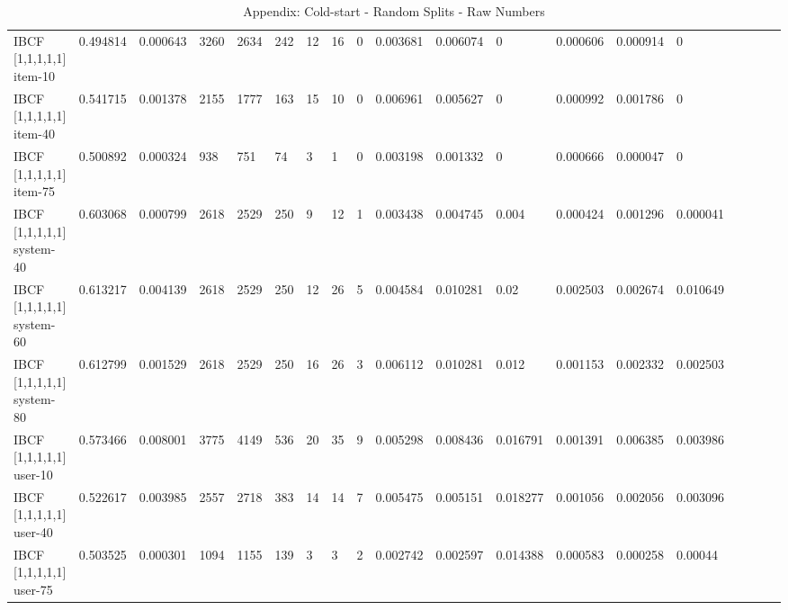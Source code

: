 \begin{table}
{\begin{tabular}{*{19}l}
IBCF [1,1,1,1,1] item-10		&	0.494814 &	0.000643 &	3260 &	2634 &	242 &	12 &	16 &	0 &	0.003681 &	0.006074 &	0 &	0.000606 &	0.000914 &	0 &	 \\
IBCF [1,1,1,1,1] item-40		&	0.541715 &	0.001378 &	2155 &	1777 &	163 &	15 &	10 &	0 &	0.006961 &	0.005627 &	0 &	0.000992 &	0.001786 &	0 &	 \\
IBCF [1,1,1,1,1] item-75		&	0.500892 &	0.000324 &	938 &	751 &	74 &	3  &	1 &	0 &	0.003198 &	0.001332 &	0 &	0.000666 &	0.000047 &	0 &	 \\
IBCF [1,1,1,1,1] system-40	&	0.603068 &	0.000799 &	2618 &	2529 &	250 &	9  &	12 &	1 &	0.003438 &	0.004745 &	0.004 &	0.000424 &	0.001296 &	0.000041 &	 \\
IBCF [1,1,1,1,1] system-60	&	0.613217 &	0.004139 &	2618 &	2529 &	250 &	12 &	26 &	5 &	0.004584 &	0.010281 &	0.02 &	0.002503 &	0.002674 &	0.010649 &	 \\
IBCF [1,1,1,1,1] system-80	&	0.612799 &	0.001529 &	2618 &	2529 &	250 &	16 &	26 &	3 &	0.006112 &	0.010281 &	0.012 &	0.001153 &	0.002332 &	0.002503 &	 \\
IBCF [1,1,1,1,1] user-10		&	0.573466 &	0.008001 &	3775 &	4149 &	536 &	20 &	35 &	9 &	0.005298 &	0.008436 &	0.016791 &	0.001391 &	0.006385 &	0.003986 &	 \\
IBCF [1,1,1,1,1] user-40		&	0.522617 &	0.003985 &	2557 &	2718 &	383 &	14 &	14 &	7 &	0.005475 &	0.005151 &	0.018277 &	0.001056 &	0.002056 &	0.003096 &	 \\
IBCF [1,1,1,1,1] user-75		&	0.503525 &	0.000301 &	1094 &	1155 &	139 &	3 &	3 &	2 &	0.002742 &	0.002597 &	0.014388 &	0.000583 &	0.000258 &	0.00044 &	 \\

\bottomrule
\end{tabular}
}
\caption{Appendix: Cold-start - Random Splits - Raw Numbers}
\end{table}
